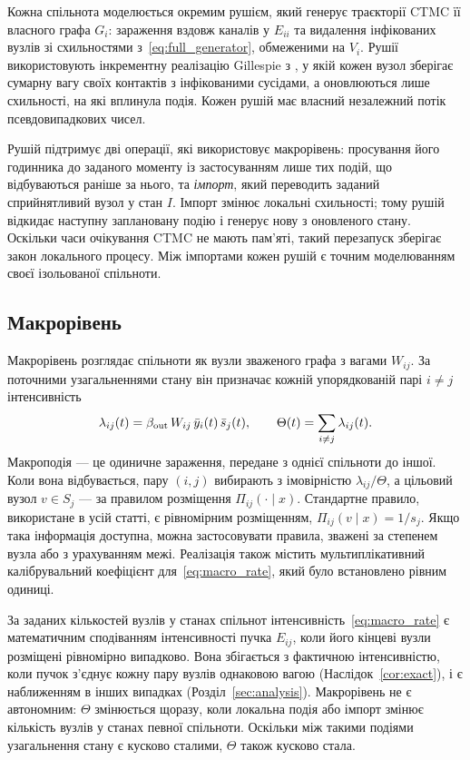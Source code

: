 Кожна спільнота моделюється окремим рушієм, який генерує траєкторії CTMC її власного графа $G_i$: зараження вздовж каналів у $E_{ii}$ та видалення інфікованих вузлів зі схильностями з~\eqref{eq:full_generator}, обмеженими на $V_i$. Рушії використовують інкрементну реалізацію Gillespie з \citet{kuryliak2025simulating}, у якій кожен вузол зберігає сумарну вагу своїх контактів з інфікованими сусідами, а оновлюються лише схильності, на які вплинула подія. Кожен рушій має власний незалежний потік псевдовипадкових чисел.

Рушій підтримує дві операції, які використовує макрорівень: просування його годинника до заданого моменту із застосуванням лише тих подій, що відбуваються раніше за нього, та \emph{імпорт}, який переводить заданий сприйнятливий вузол у стан $I$. Імпорт змінює локальні схильності; тому рушій відкидає наступну заплановану подію і генерує нову з оновленого стану. Оскільки часи очікування CTMC не мають пам'яті, такий перезапуск зберігає закон локального процесу. Між імпортами кожен рушій є точним моделюванням своєї ізольованої спільноти.

\subsection{Макрорівень}
\label{sec:macro}

Макрорівень розглядає спільноти як вузли зваженого графа з вагами $W_{ij}$. За поточними узагальненнями стану він призначає кожній упорядкованій парі $i\neq j$ інтенсивність
\begin{equation}
\label{eq:macro_rate}
\lambda_{ij}(t)=\beta_{\mathrm{out}}\,W_{ij}\,\bar{y}_i(t)\,\bar{s}_j(t),
\qquad
\Theta(t)=\sum_{i\neq j}\lambda_{ij}(t).
\end{equation}
Макроподія --- це одиничне зараження, передане з однієї спільноти до іншої. Коли вона відбувається, пару $(i,j)$ вибирають з імовірністю $\lambda_{ij}/\Theta$, а цільовий вузол $v\in S_j$ --- за правилом розміщення $\Pi_{ij}(\cdot\mid x)$. Стандартне правило, використане в усій статті, є рівномірним розміщенням, $\Pi_{ij}(v\mid x)=1/s_j$. Якщо така інформація доступна, можна застосовувати правила, зважені за степенем вузла або з урахуванням межі. Реалізація також містить мультиплікативний калібрувальний коефіцієнт для~\eqref{eq:macro_rate}, який було встановлено рівним одиниці.

За заданих кількостей вузлів у станах спільнот інтенсивність~\eqref{eq:macro_rate} є математичним сподіванням інтенсивності пучка $E_{ij}$, коли його кінцеві вузли розміщені рівномірно випадково. Вона збігається з фактичною інтенсивністю, коли пучок з'єднує кожну пару вузлів однаковою вагою (Наслідок~\ref{cor:exact}), і є наближенням в інших випадках (Розділ~\ref{sec:analysis}). Макрорівень не є автономним: $\Theta$ змінюється щоразу, коли локальна подія або імпорт змінює кількість вузлів у станах певної спільноти. Оскільки між такими подіями узагальнення стану є кусково сталими, $\Theta$ також кусково стала.

